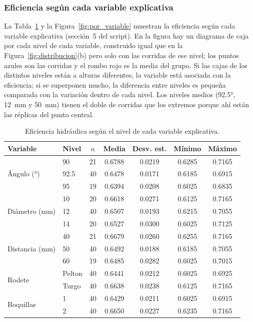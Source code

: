 \subsubsection{Eficiencia según cada variable explicativa}

La Tabla~\ref{tab:niveles} y la Figura~\ref{fig:por_variable} muestran la eficiencia según cada variable explicativa (sección~5 del script). En la figura hay un diagrama de caja por cada nivel de cada variable, construido igual que en la Figura~\ref{fig:distribucion}(b) pero solo con las corridas de ese nivel; los puntos azules son las corridas y el rombo rojo es la media del grupo. Si las cajas de los distintos niveles están a alturas diferentes, la variable está asociada con la eficiencia; si se superponen mucho, la diferencia entre niveles es pequeña comparada con la variación dentro de cada nivel. Los niveles medios (92.5°, 12~mm y 50~mm) tienen el doble de corridas que los extremos porque ahí están las réplicas del punto central.

\begin{table}[H]
\centering
\caption{Eficiencia hidráulica según el nivel de cada variable explicativa.}
\label{tab:niveles}
\begin{tabular}{llccccc}
\toprule
Variable & Nivel & $n$ & Media & Desv. est. & Mínimo & Máximo \\
\midrule
\multirow{3}{*}{Ángulo (°)}       & 90    & 21 & 0.6788 & 0.0219 & 0.6285 & 0.7165 \\
                                  & 92.5  & 40 & 0.6478 & 0.0171 & 0.6185 & 0.6915 \\
                                  & 95    & 19 & 0.6394 & 0.0208 & 0.6025 & 0.6835 \\
\midrule
\multirow{3}{*}{Diámetro (mm)}    & 10    & 20 & 0.6618 & 0.0271 & 0.6125 & 0.7165 \\
                                  & 12    & 40 & 0.6507 & 0.0193 & 0.6215 & 0.7055 \\
                                  & 14    & 20 & 0.6527 & 0.0300 & 0.6025 & 0.7125 \\
\midrule
\multirow{3}{*}{Distancia (mm)}   & 40    & 21 & 0.6679 & 0.0260 & 0.6255 & 0.7165 \\
                                  & 50    & 40 & 0.6492 & 0.0188 & 0.6185 & 0.7055 \\
                                  & 60    & 19 & 0.6485 & 0.0282 & 0.6025 & 0.7015 \\
\midrule
\multirow{2}{*}{Rodete}           & Pelton & 40 & 0.6441 & 0.0212 & 0.6025 & 0.6925 \\
                                  & Turgo  & 40 & 0.6638 & 0.0238 & 0.6125 & 0.7165 \\
\midrule
\multirow{2}{*}{Boquillas}        & 1     & 40 & 0.6429 & 0.0211 & 0.6025 & 0.6915 \\
                                  & 2     & 40 & 0.6650 & 0.0227 & 0.6235 & 0.7165 \\
\bottomrule
\end{tabular}
\end{table}

